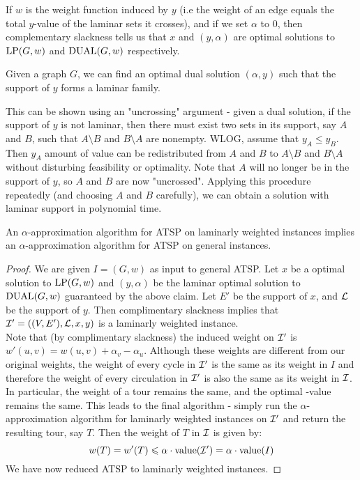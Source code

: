 \documentclass[./main.tex]{subfiles}
\begin{document}
	If $w$ is the weight function induced by $y$ (i.e the weight of an edge equals the total $y$-value of the laminar sets it crosses), and if we set $\alpha$ to $0$, then complementary slackness tells us that $x$ and $(y,\alpha)$ are optimal solutions to $\textup{LP}(G,w)$ and $\textup{DUAL}(G,w)$ respectively.\\

	\begin{claim*}
		Given a graph $G$, we can find an optimal dual solution $(\alpha, y)$ such that the support of $y$ forms a laminar family.
	\end{claim*}

	This can be shown using an "uncrossing" argument - given a dual solution, if the support of $y$ is not laminar, then there must exist two sets in its support, say $A$ and $B$, such that $A\setminus B$ and $B\setminus A$ are nonempty. 
	WLOG, assume that $y_A \leqslant y_B$. Then $y_A$ amount of value can be redistributed from $A$ and $B$ to $A\setminus B$ and $B\setminus A$ without disturbing feasibility or optimality. 
	Note that $A$ will no longer be in the support of $y$, so $A$ and $B$ are now "uncrossed". 
	Applying this procedure repeatedly (and choosing $A$ and $B$ carefully), we can obtain a solution with laminar support in polynomial time.\\
		\begin{theorem} 
			An $\alpha$-approximation algorithm for ATSP on laminarly weighted instances implies an $\alpha$-approximation algorithm for ATSP on general instances.
		\end{theorem}
		\begin{proof} 
			We are given $I=(G,w)$ as input to general ATSP. Let $x$ be a optimal solution to $\textup{LP}(G,w)$ and $(y,\alpha)$ be the laminar optimal solution to $\textup{DUAL}(G,w)$ guaranteed by the above claim. 
			Let $E'$ be the support of $x$, and $\mathcal{L}$ be the support of $y$. Then complimentary slackness implies that $\mathcal{I}'=((V,E'), \mathcal{L}, x, y)$ is a laminarly weighted instance.\\
			Note that (by complimentary slackness) the induced weight on $\mathcal{I}'$ is $w'(u,v) = w(u,v) + \alpha_v - \alpha_u$. Although these weights are different from our original weights, the weight of every cycle in $\mathcal{I}'$ is the same as its weight in $I$ and therefore the weight of every circulation in $\mathcal{I}'$ is also the same as its weight in $\mathcal{I}$. In particular, the weight of a tour remains the same, and the optimal \LP-value remains the same. 
			This leads to the final algorithm - simply run the $\alpha$-approximation algorithm for laminarly weighted instances on $\mathcal{I}'$ and return the resulting tour, say $T$. 
			Then the weight of $T$ in $\mathcal{I}$ is given by: 
			\[
				w(T) = w'(T)\leqslant \alpha\cdot \textup{value}(\mathcal{I}') = \alpha\cdot\textup{value}(I)
			\]
			We have now reduced ATSP to laminarly weighted instances.
		\end{proof}
\end{document}
